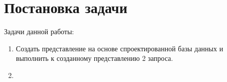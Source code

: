 \newpage
\section{Постановка задачи}

Задачи данной работы:
\begin{enumerate}
    \item Создать представление на основе спроектированной базы данных и выполнить к созданному представлению 2 запроса.
    \item 
\end{enumerate}

